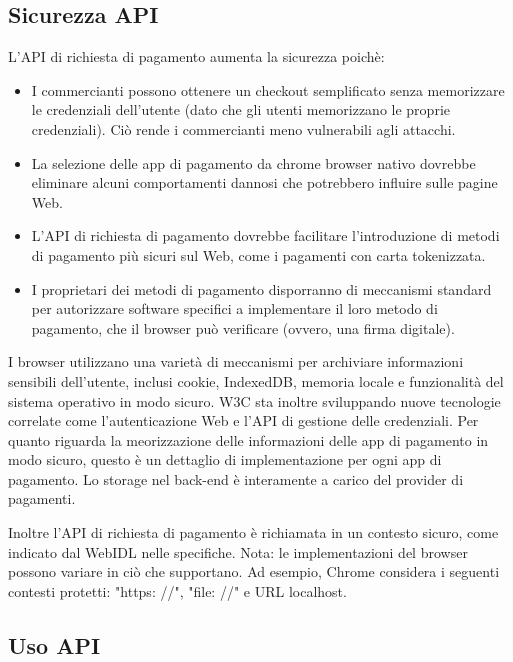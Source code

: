 \documentclass[italian]{article}
\begin{document}
	\subsection{Sicurezza API}
	L'API di richiesta di pagamento aumenta la sicurezza poichè:
	\begin{itemize}
	\item I commercianti possono ottenere un checkout semplificato senza memorizzare le credenziali dell'utente (dato che gli utenti memorizzano le proprie credenziali). Ciò rende i commercianti meno vulnerabili agli attacchi.
	\item La selezione delle app di pagamento da chrome browser nativo dovrebbe eliminare alcuni comportamenti dannosi che potrebbero influire sulle pagine Web.
	\item L'API di richiesta di pagamento dovrebbe facilitare l'introduzione di metodi di pagamento più sicuri sul Web, come i pagamenti con carta tokenizzata.
	\item I proprietari dei metodi di pagamento disporranno di meccanismi standard per autorizzare software specifici a implementare il loro metodo di pagamento, che il browser può verificare (ovvero, una firma digitale).
	\end{itemize}
	I browser utilizzano una varietà di meccanismi per archiviare informazioni sensibili dell'utente, inclusi cookie, IndexedDB, memoria locale e funzionalità del sistema operativo in modo sicuro. W3C sta inoltre sviluppando nuove tecnologie correlate come l'autenticazione Web e l'API di gestione delle credenziali.
	Per quanto riguarda la meorizzazione delle informazioni delle app di pagamento in modo sicuro, questo è un dettaglio di implementazione per ogni app di pagamento. Lo storage nel back-end è interamente a carico del provider di pagamenti.
	
	Inoltre l'API di richiesta di pagamento è richiamata in un contesto sicuro, come indicato dal WebIDL nelle specifiche. 
	Nota: le implementazioni del browser possono variare in ciò che supportano. Ad esempio, Chrome considera i seguenti contesti protetti: "https: //", "file: //" e URL localhost.
	


	
	\subsection{Uso API}
\end{document}
